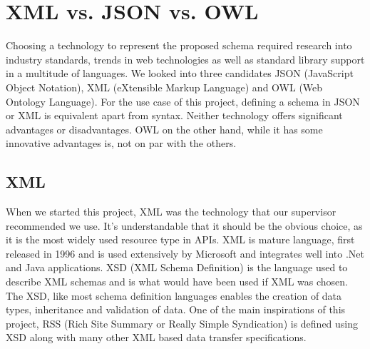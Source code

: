 \documentclass{article}
\begin{document}
\section{XML vs. JSON vs. OWL}
Choosing a technology to represent the proposed schema required research into industry standards, trends in web technologies as well as standard library support in a multitude of languages. We looked into three candidates JSON (JavaScript Object Notation), XML (eXtensible Markup Language) and OWL (Web Ontology Language). For the use case of this project, defining a schema in JSON or XML is equivalent apart from syntax. Neither technology offers significant advantages or disadvantages. OWL on the other hand, while it has some innovative advantages is, not on par with the others.

\subsection{XML}
When we started this project, XML was the technology that our supervisor recommended we use. It's understandable that it should be the obvious choice, as it is the most widely used resource type in APIs\cite{maleshkova2010investigating}. XML is mature language, first released in 1996 and is used extensively by Microsoft and integrates well into .Net and Java applications. XSD (XML Schema Definition) is the language used to describe XML schemas and is what would have been used if XML was chosen. The XSD, like most schema definition languages enables the creation of data types, inheritance and validation of data. One of the main inspirations of this project, RSS (Rich Site Summary or Really Simple Syndication) is defined using XSD along with many other XML based data transfer specifications.
\end{document}
